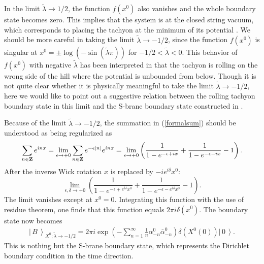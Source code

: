\documentclass[a4paper,12pt]{article} \textheight=8.5truein
\newcommand{\ket}[1]{\left|\, #1\,\right\rangle}
\newcommand{\ra}{\rightarrow}
\newcommand{\tlambda}{\tilde{\lambda}}
\begin{document}
In the limit $\tilde\lambda\ra 1/2$, the
function $f(x^0)$ also vanishes and the whole boundary state
becomes zero. This implies that the system is at the closed string
vacuum, which corresponds to placing the tachyon at the minimum of
its potential \cite{Sen:2002nu}. We should be more careful in
taking the limit $\tilde\lambda\ra -1/2$, since the function
$f(x^0)$ is singular at $x^0=\pm\log(-\sin(\tilde\lambda\pi))$ for
 $-1/2<\tilde\lambda<0$. This behavior of $f(x^0)$ with negative
$\tilde\lambda$ has been interpreted in \cite{Sen:2002nu} that the
tachyon is rolling on the wrong side of the hill where the
potential is unbounded from below. Though it is not quite clear
whether it is physically meaningful to take the limit
$\tilde\lambda\ra -1/2$, here we would like to point out a
suggestive relation between the rolling tachyon boundary state in
this limit and the S-brane boundary state constructed in
\cite{Gutperle:2002ai}.

Because of the limit $\tlambda\ra-1/2$, the summation in
(\ref{formalsum}) should be understood as being regularized as
\begin{equation}
\sum_{n\in{\bf Z}}e^{inx} =\lim_{\epsilon \rightarrow +0}
\sum_{n\in{\bf Z}} e^{-\epsilon|n|}e^{inx} =\lim_{\epsilon
\rightarrow +0} \left(\frac{1}{1-e^{-\epsilon+ix}}+
\frac{1}{1-e^{-\epsilon-ix}}-1\right).
\end{equation}
After the inverse Wick rotation $x$ is replaced by $-i
e^{i\delta}x^0$:
\begin{equation}
\lim_{\epsilon,\delta \rightarrow +0}
\left(\frac{1}{1-e^{-\epsilon+e^{i\delta}x^0}}+
\frac{1}{1-e^{-\epsilon-e^{i\delta}x^0}}-1\right).
\end{equation}
The limit vanishes except at $x^0=0$.
Integrating this function with the use of residue theorem,
one finds that this function equals $2\pi i\delta(x^0)$.
The boundary state now becomes
\begin{eqnarray}
\ket{B}_{X^0;\tilde\lambda\ra-1/2}=2\pi i \exp\left(
-\sum_{n=1}^\infty\frac{1}{n}\alpha^0_{-n}\bar\alpha^0_{-n}
\right)\delta(X^0(0))\ket{0}.
\end{eqnarray}
This is nothing but the S-brane boundary state,
which represents the Dirichlet boundary condition in the time
direction.
\end{document}
